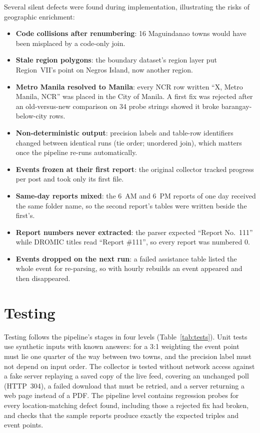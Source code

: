 \documentclass[acmtog]{acmart}
\begin{document}
Several silent defects were found during implementation, illustrating the risks of geographic
enrichment:
\begin{itemize}
\item \textbf{Code collisions after renumbering}: 16 Maguindanao towns would have been misplaced
  by a code-only join.
\item \textbf{Stale region polygons}: the boundary dataset's region layer put Region~VII's point
  on Negros Island, now another region.
\item \textbf{Metro Manila resolved to Manila}: every NCR row written ``X, Metro Manila, NCR'' was
  placed in the City of Manila. A first fix was rejected after an old-versus-new comparison on 34
  probe strings showed it broke barangay-below-city rows.
\item \textbf{Non-deterministic output}: precision labels and table-row identifiers changed
  between identical runs (tie order; unordered join), which matters once the pipeline re-runs
  automatically.
\item \textbf{Events frozen at their first report}: the original collector tracked progress per
  post and took only its first file.
\item \textbf{Same-day reports mixed}: the 6~AM and 6~PM reports of one day received the same
  folder name, so the second report's tables were written beside the first's.
\item \textbf{Report numbers never extracted}: the parser expected ``Report No.~111'' while
  DROMIC titles read ``Report \#111'', so every report was numbered 0.
\item \textbf{Events dropped on the next run}: a failed assistance table listed the whole event
  for re-parsing, so with hourly rebuilds an event appeared and then disappeared.
\end{itemize}

\section{Testing}
\label{sec:testing}

Testing follows the pipeline's stages in four levels (Table~\ref{tab:tests}). Unit tests use
synthetic inputs with known answers: for a 3:1 weighting the event point must lie one quarter of
the way between two towns, and the precision label must not depend on input order. The collector
is tested without network access against a fake server replaying a saved copy of the live feed,
covering an unchanged poll (HTTP~304), a failed download that must be retried, and a server
returning a web page instead of a PDF. The pipeline level contains regression probes for every
location-matching defect found, including those a rejected fix had broken, and checks that the
sample reports produce exactly the expected triples and event points.
\end{document}
